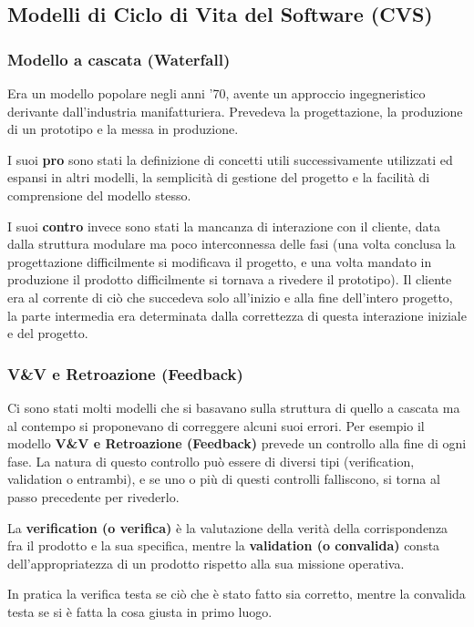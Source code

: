 \subsection{Modelli di Ciclo di Vita del Software (CVS)}
    \subsubsection{Modello a cascata (Waterfall)}
        Era un modello popolare negli anni '70, avente un approccio ingegneristico derivante dall'industria manifatturiera. Prevedeva la progettazione, la produzione di un prototipo e la messa in produzione.
        
        I suoi \textbf{pro} sono stati la definizione di concetti utili successivamente utilizzati ed espansi in altri modelli, la semplicità di gestione del progetto e la facilità di comprensione del modello stesso.
        
        I suoi \textbf{contro} invece sono stati la mancanza di interazione con il cliente, data dalla struttura modulare ma poco interconnessa delle fasi (una volta conclusa la progettazione difficilmente si modificava il progetto, e una volta mandato in produzione il prodotto difficilmente si tornava a rivedere il prototipo). Il cliente era al corrente di ciò che succedeva solo all'inizio e alla fine dell'intero progetto, la parte intermedia era determinata dalla correttezza di questa interazione iniziale e del progetto.
        
    \subsubsection{V\&V e Retroazione (Feedback)}
        Ci sono stati molti modelli che si basavano sulla struttura di quello a cascata ma al contempo si proponevano di correggere alcuni suoi errori. Per esempio il modello \textbf{V\&V e Retroazione (Feedback)} prevede un controllo alla fine di ogni fase. La natura di questo controllo può essere di diversi tipi (verification, validation o entrambi), e se uno o più di questi controlli falliscono, si torna al passo precedente per rivederlo.
        
        La \textbf{verification (o verifica)} è la valutazione della verità della corrispondenza fra il prodotto e la sua specifica, mentre la \textbf{validation (o convalida)} consta dell'appropriatezza di un prodotto rispetto alla sua missione operativa.
        
        In pratica la verifica testa se ciò che è stato fatto sia corretto, mentre la convalida testa se si è fatta la cosa giusta in primo luogo.
        
